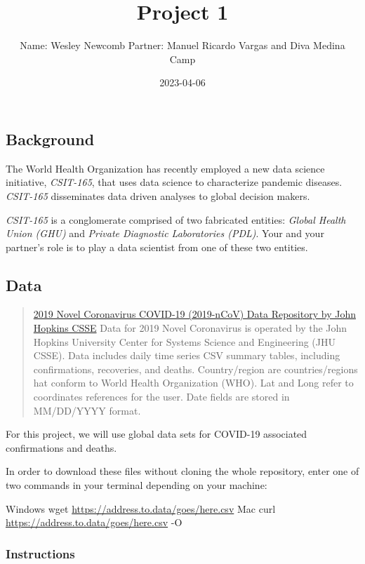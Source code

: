 \documentclass[
]{article}
\title{Project 1}
\author{Name: Wesley Newcomb Partner: Manuel Ricardo Vargas and Diva
Medina Camp}
\date{2023-04-06}
\begin{document}
\maketitle

\hypertarget{background}{%
\subsection{Background}\label{background}}

The World Health Organization has recently employed a new data science
initiative, \emph{CSIT-165}, that uses data science to characterize
pandemic diseases. \emph{CSIT-165} disseminates data driven analyses to
global decision makers.

\emph{CSIT-165} is a conglomerate comprised of two fabricated entities:
\emph{Global Health Union (GHU)} and \emph{Private Diagnostic
Laboratories (PDL)}. Your and your partner's role is to play a data
scientist from one of these two entities.

\hypertarget{data}{%
\subsection{Data}\label{data}}

\begin{quote}
\href{https://github.com/CSSEGISandData/COVID-19/tree/master/csse_covid_19_data/csse_covid_19_time_series}{2019
Novel Coronavirus COVID-19 (2019-nCoV) Data Repository by John Hopkins
CSSE} Data for 2019 Novel Coronavirus is operated by the John Hopkins
University Center for Systems Science and Engineering (JHU CSSE). Data
includes daily time series CSV summary tables, including confirmations,
recoveries, and deaths. Country/region are countries/regions hat conform
to World Health Organization (WHO). Lat and Long refer to coordinates
references for the user. Date fields are stored in MM/DD/YYYY format.
\end{quote}

For this project, we will use global data sets for COVID-19 associated
confirmations and deaths.

In order to download these files without cloning the whole repository,
enter one of two commands in your terminal depending on your machine:

Windows wget \url{https://address.to.data/goes/here.csv} Mac curl
\url{https://address.to.data/goes/here.csv} -O

\hypertarget{instructions}{%
\subsubsection{Instructions}\label{instructions}}
\end{document}
